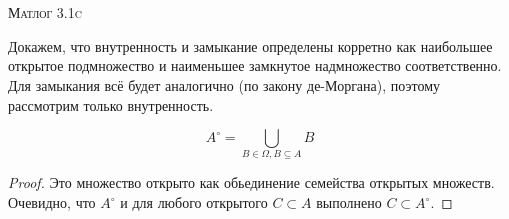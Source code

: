 \documentclass[10pt]{article}
\begin{document}
\def\chap#1#2{\ \\ {\large\bf#1 \ | \ \tt\scshape#2} \par}

\ \vspace{-1cm}

{\bf
\ \\
\Large\centerline{\scshape Матлог 3.1c}
}\normalsize
\vspace{0.5cm}

Докажем, что внутренность и замыкание определены корретно как наибольшее открытое подмножество и наименьшее замкнутое надмножество соответственно.
Для замыкания всё будет аналогично (по закону де-Моргана), поэтому рассмотрим только внутренность.

\[ A^\circ = \bigcup_{B\in\Omega, B\subseteq A} B\]

\begin{proof}
    Это множество открыто как обьединение семейства открытых множеств.
    Очевидно, что $A^\circ$ и для любого открытого $C \subset A$ выполнено $C\subset A^\circ$. 
\end{proof}
\end{document}
